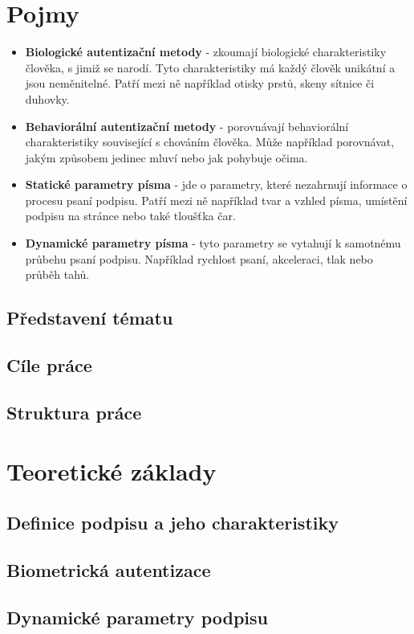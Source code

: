 \chapter{Pojmy}
\begin{itemize}
  \item{\textbf{Biologické autentizační metody} - zkoumají biologické charakteristiky člověka, s jimiž se narodí. Tyto charakteristiky má každý člověk unikátní a jsou neměnitelné. Patří mezi ně například otisky prstů, skeny sítnice či duhovky.}  
  \item{\textbf{Behaviorální autentizační metody} - porovnávají behaviorální charakteristiky související s chováním člověka. Může například porovnávat, jakým způsobem jedinec mluví nebo jak pohybuje očima.}
  \item{\textbf{Statické parametry písma} - jde o parametry, které nezahrnují informace o procesu psaní podpisu. Patří mezi ně například tvar a vzhled písma, umístění podpisu na stránce nebo také tloušťka čar.}
  \item{\textbf{Dynamické parametry písma} - tyto parametry se vytahují k samotnému průbehu psaní podpisu. Například rychlost psaní, akceleraci, tlak nebo průběh tahů.}
\end{itemize}
\section{Představení tématu}
\section{Cíle práce}
\section{Struktura práce}

\chapter{Teoretické základy}
\section{Definice podpisu a jeho charakteristiky}
\section{Biometrická autentizace}
\section{Dynamické parametry podpisu}
